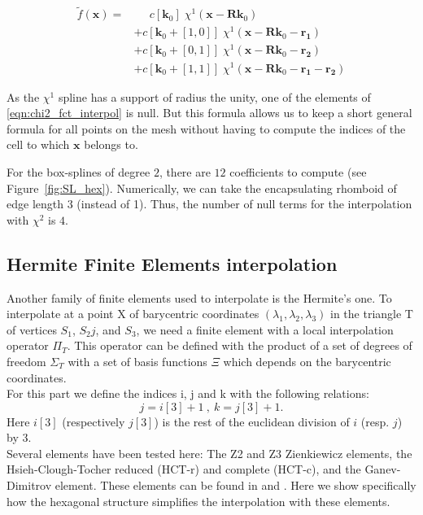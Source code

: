 \documentclass[proc]{edpsmath}
\begin{document}
\begin{align}
\label{eqn:chi2_fct_interpol}
\tilde{f}(\mathbf{x}) =& \;\;\;\;\; c[\mathbf{k}_0] \; \chi^1(\mathbf{x} - \mathbf{R}\mathbf{k}_0) \nonumber\\
	&+ c[\mathbf{k}_0 +[1,0]]\; \chi^1(\mathbf{x} - \mathbf{R}\mathbf{k}_0 - \mathbf{r_1}) \nonumber\\
	&+ c[\mathbf{k}_0 +[0,1]]\; \chi^1(\mathbf{x} - \mathbf{R}\mathbf{k}_0 - \mathbf{r_2}) \nonumber\\
	&+ c[\mathbf{k}_0 +[1,1]]\; \chi^1(\mathbf{x} - \mathbf{R}\mathbf{k}_0 - \mathbf{r_1} - \mathbf{r_2})
\end{align}

\rmrk  As the $\chi^1$ spline has a support of radius the unity, one of the elements of \eqref{eqn:chi2_fct_interpol} is null. But this formula allows us to keep a short general formula for all points on the mesh without having to compute the indices of the cell to which $\mathbf{x}$ belongs to.

\rmrk For the box-splines of degree $2$, there are $12$ coefficients to compute (see Figure~\ref{fig:SL_hex}). Numerically, we can take the encapsulating rhomboid of edge length $3$ (instead of 1). Thus, the number of null terms for the interpolation with $\chi^2$ is $4$.

\subsection{Hermite Finite Elements interpolation}

Another family of finite elements used to interpolate is the Hermite's one.
To interpolate at a point X of barycentric coordinates $(\lambda_1,\lambda_2,\lambda_3)$ in the triangle T of vertices $S_1$, $S_2j$, and $S_3$, we need a finite element with a local interpolation operator $\Pi_T $. This operator can be defined with the product of a set of degrees of freedom $\Sigma_T$ with a set of basis functions $\Xi$ which depends on the barycentric coordinates.\\
For this part we define the indices i, j and k with the following relations:
\begin{equation*}
j=i[3]+1 ~,~ k=j[3]+1.
\end{equation*}  
Here $i[3]$ (respectively $j[3]$) is the rest of the euclidean division of $i$ (resp. $j$) by $3$.\\

Several elements have been tested here:
The Z2 and Z3 Zienkiewicz elements, the Hsieh-Clough-Tocher reduced (HCT-r) and complete (HCT-c), and the Ganev-Dimitrov element. These elements can be found in \cite{z} and \cite{b1} . Here we show specifically how the hexagonal structure simplifies the interpolation with these elements.\\
\end{document}
